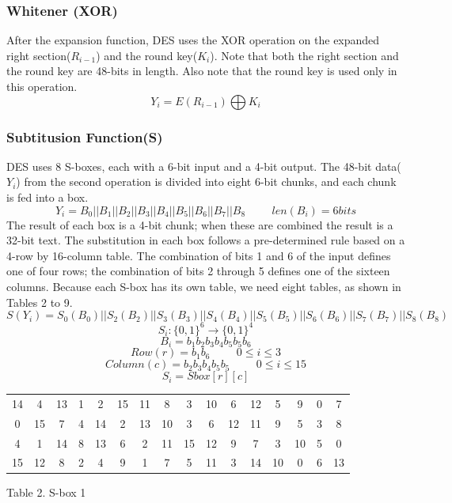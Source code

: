\documentclass[11pt]{article}
\begin{document}
\subsubsection*{Whitener (XOR)}
After the expansion function, DES uses the XOR operation on the expanded right section($R_{i-1}$) and the round key($K_i$). Note that both the right section and the round key are 48-bits in length. Also note that the round key is used only in this operation.
\[ Y_i = E(R_{i-1}) \bigoplus K_{i} \]

\subsubsection*{Subtitusion Function(S)}
DES uses 8 S-boxes, each with a 6-bit input and a 4-bit output. The 48-bit data($Y_i$) from the second operation is divided into eight 6-bit chunks, and each chunk is fed into a box.
\[ Y_i = B_0 || B_1 || B_2 || B_3 || B_4 || B_5 || B_6 || B_7 || B_8 \hspace{1cm} len(B_i)=6bits \]
The result of each box is a 4-bit chunk; when these are combined the result is a 32-bit text. The substitution in each box follows a pre-determined rule based on a 4-row by 16-column table. The combination of bits 1 and 6 of the input defines one of four rows; the combination of bits 2 through 5 defines one of the sixteen columns. Because each S-box has its own table, we need eight tables, as shown in Tables 2 to 9.
\[ S(Y_i) = S_0(B_0) || S_2(B_2) || S_3(B_3) || S_4(B_4) || S_5(B_5) || S_6(B_6) || S_7(B_7) || S_8(B_8)\]
\[S_i : \{0, 1\}^{6} \to \{0, 1\}^{4}\]
\[B_i = b_1b_2b_3b_4b_5b_5b_6\]
\[Row(r) = b_1b_6 \hspace{1cm} 0\leq i \leq3 \]
\[Column(c) = b_2b_3b_4b_5b_5 \hspace{1cm} 0\leq i \leq15 \]
\[S_i = Sbox[r][c]\]
\begin{center}
\begin{tabular}{ | c | c | c | c | c | c | c | c | c | c | c | c | c | c | c | c |}
  \hline
    14&	4& 13& 1& 2& 15& 11& 8&	3& 10& 6& 12& 5& 9&	0& 7\\
    0&	15& 7& 4& 14& 2& 13& 10& 3& 6& 12& 11& 9& 5& 3& 8\\
    4&	1& 14& 8& 13& 6& 2& 11&	15& 12& 9& 7& 3& 10& 5& 0\\
    15&	12& 8& 2& 4& 9& 1& 7& 5& 11& 3& 14& 10& 0&	6& 13\\
  \hline
\end{tabular}
\end{center}
\begin{center}
Table 2. S-box 1
\end{center}
\end{document}
